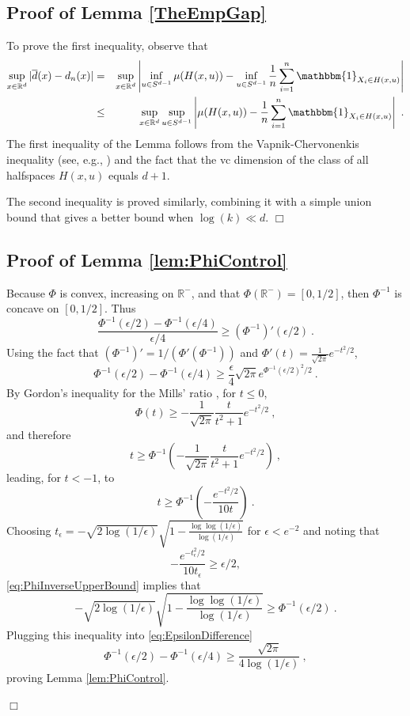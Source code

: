 \documentclass[12pt]{article}
\newcommand{\R}{\mathbb{R}}
\newcommand{\ol}{\overline}
\def\IND{\mathbbm{1}}
\newcommand{\qed}{\hfill $\Box$}
\newenvironment{proof}{\par\noindent{\bf Proof:}}{\qed \par\medskip\noindent}
\begin{document}
\subsection{Proof of Lemma \ref{TheEmpGap}}


\begin{proof}
To prove the first inequality, observe that
\begin{eqnarray*}
\sup_{x\in \R^d} |\ol{d}(x) - d_n(x)|
& = &
\sup_{x\in \R^d} \left|\inf_{u\in S^{d-1}}\mu(H(x,u)) 
- \inf_{u\in S^{d-1}}\frac{1}{n}\sum_{i=1}^n \IND_{X_i \in H(x,u)} \right|
\\
& \le &
\sup_{x\in \R^d} \sup_{u\in S^{d-1}}\left|\mu(H(x,u))
- \frac{1}{n}\sum_{i=1}^n \IND_{X_i \in H(x,u)} \right|~.
\end{eqnarray*}
The first inequality of the Lemma follows from the 
Vapnik-Chervonenkis inequality (see, e.g., \cite[Theorem 12.5]{devroye2013probabilistic}) and the fact that the 
{\sc vc} dimension of the class of all halfspaces $H(x,u)$
equals $d+1$.

\noindent The second inequality is proved similarly, combining it with
a simple union bound that gives a better bound when $\log(k) \ll d$.
\end{proof}

\subsection{Proof of Lemma \ref{lem:PhiControl}}

\begin{proof}
Because $\Phi$ is convex, increasing on $\R^-$, and that $\Phi(\R^-)=[0,1/2]$, then $\Phi^{-1}$ is concave on $[0,1/2]$. Thus
$$  \frac{\Phi^{-1}(\epsilon/2)-\Phi^{-1}(\epsilon/4)}{\epsilon/4}  \geq (\Phi^{-1})'(\epsilon/2)~. $$
Using the fact that $(\Phi^{-1})'=1/(\Phi'(\Phi^{-1}))$ and $\Phi'(t)=\frac{1}{\sqrt{2\pi}}e^{-t^2/2}$,
\begin{equation}\label{eq:EpsilonDifference}
\Phi^{-1}(\epsilon/2)-\Phi^{-1}(\epsilon/4)\geq \frac{\epsilon}{4}\sqrt{2\pi}e^{\Phi^{-1}(\epsilon/2)^2/2 }~.
\end{equation}
By Gordon's inequality for the Mills' ratio \cite{Gor41}, for $t\leq0$,
$$ \Phi(t)\geq -\frac{1}{\sqrt{2\pi}}\frac{t}{t^2+1}e^{-t^2/2}~, $$
and therefore
$$ t \geq \Phi^{-1}\left(  -\frac{1}{\sqrt{2\pi}}\frac{t}{t^2+1}e^{-t^2/2} \right)~,$$
leading, for $t<-1$, to
\begin{equation}\label{eq:PhiInverseUpperBound}
t\geq  \Phi^{-1}\left(  -\frac{e^{-t^2/2}}{10t} \right)~.
\end{equation}
Choosing $t_{\epsilon}=-\sqrt{2
  \log(1/\epsilon)}\sqrt{1-\frac{\log\log(1/\epsilon)}{\log(1/\epsilon)}}$
for $\epsilon<e^{-2}$ and noting that
 $$  -\frac{e^{-t_{\epsilon}^2/2}}{10t_{\epsilon}}\geq \epsilon/2, $$
\eqref{eq:PhiInverseUpperBound} implies that
$$-\sqrt{2 \log(1/\epsilon)}\sqrt{1-\frac{\log\log(1/\epsilon)}{\log(1/\epsilon)}}\geq \Phi^{-1}(\epsilon/2)~.$$
Plugging this inequality into \eqref{eq:EpsilonDifference}
$$ \Phi^{-1}(\epsilon/2)-\Phi^{-1}(\epsilon/4)\geq
\frac{\sqrt{2\pi}}{4\log(1/\epsilon)}~, $$
proving Lemma \eqref{lem:PhiControl}.

\end{proof}
\end{document}
